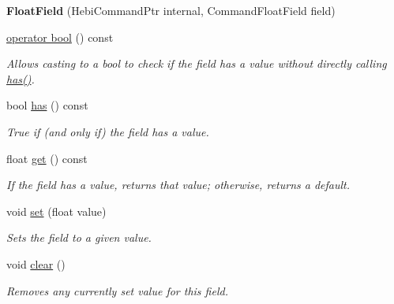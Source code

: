 \begin{DoxyCompactItemize}
\item 
{\bfseries Float\+Field} (Hebi\+Command\+Ptr internal, Command\+Float\+Field field)\hypertarget{classhebi_1_1Command_1_1FloatField_a4eb2e80bc5c55e9dc87bba49430278c5}{}\label{classhebi_1_1Command_1_1FloatField_a4eb2e80bc5c55e9dc87bba49430278c5}

\item 
\hyperlink{classhebi_1_1Command_1_1FloatField_ae4983503c21f98ec479cc1bb73390754}{operator bool} () const 
\begin{DoxyCompactList}\small\item\em Allows casting to a bool to check if the field has a value without directly calling {\ttfamily \hyperlink{classhebi_1_1Command_1_1FloatField_a7220a798fceba4d3256d677b169359f1}{has()}}. \end{DoxyCompactList}\item 
bool \hyperlink{classhebi_1_1Command_1_1FloatField_a7220a798fceba4d3256d677b169359f1}{has} () const \hypertarget{classhebi_1_1Command_1_1FloatField_a7220a798fceba4d3256d677b169359f1}{}\label{classhebi_1_1Command_1_1FloatField_a7220a798fceba4d3256d677b169359f1}

\begin{DoxyCompactList}\small\item\em True if (and only if) the field has a value. \end{DoxyCompactList}\item 
float \hyperlink{classhebi_1_1Command_1_1FloatField_a5befd8ced9cb015d80ff144c4592d492}{get} () const \hypertarget{classhebi_1_1Command_1_1FloatField_a5befd8ced9cb015d80ff144c4592d492}{}\label{classhebi_1_1Command_1_1FloatField_a5befd8ced9cb015d80ff144c4592d492}

\begin{DoxyCompactList}\small\item\em If the field has a value, returns that value; otherwise, returns a default. \end{DoxyCompactList}\item 
void \hyperlink{classhebi_1_1Command_1_1FloatField_aa69fab0a635374ad6e7408c6bebe9f51}{set} (float value)\hypertarget{classhebi_1_1Command_1_1FloatField_aa69fab0a635374ad6e7408c6bebe9f51}{}\label{classhebi_1_1Command_1_1FloatField_aa69fab0a635374ad6e7408c6bebe9f51}

\begin{DoxyCompactList}\small\item\em Sets the field to a given value. \end{DoxyCompactList}\item 
void \hyperlink{classhebi_1_1Command_1_1FloatField_a2ba855477fe5a19a90da2b88ed716f13}{clear} ()\hypertarget{classhebi_1_1Command_1_1FloatField_a2ba855477fe5a19a90da2b88ed716f13}{}\label{classhebi_1_1Command_1_1FloatField_a2ba855477fe5a19a90da2b88ed716f13}

\begin{DoxyCompactList}\small\item\em Removes any currently set value for this field. \end{DoxyCompactList}\end{DoxyCompactItemize}


